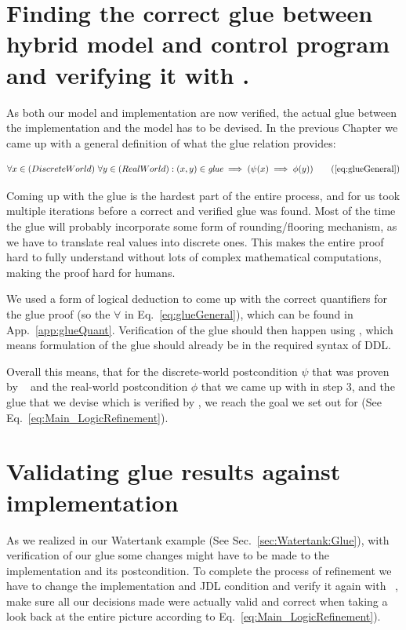 \section{Finding the correct glue between hybrid model and control program and verifying it with \keym.}
\label{sec:Process:Glue}

As both our model and implementation are now verified, the actual glue between the implementation and the model has to be devised. In the previous Chapter we came up with a general definition of what the glue relation provides:

\begin{equation}
	\centering
	\begin{split}
		\forall x \in (Discrete World)~\forall y \in (Real World):(x,y) \in \textit{glue} \implies (\psi(x) \implies \phi(y))
	\end{split}
	\tag{\ref{eq:glueGeneral}}
\end{equation}

Coming up with the glue is the hardest part of the entire process, and for us took multiple iterations before a correct and verified glue was found. Most of the time the glue will probably incorporate some form of rounding/flooring mechanism, as we have to translate real values into discrete ones. This makes the entire proof hard to fully understand without lots of complex mathematical computations, making the proof hard for humans.

We used a form of logical deduction to come up with the correct quantifiers for the glue proof (so the \(\forall\) in Eq.~\ref{eq:glueGeneral}), which can be found in App.~\ref{app:glueQuant}. Verification of the glue should then happen using \keym, which means formulation of the glue should already be in the required syntax of DDL.

Overall this means, that for the discrete-world postcondition \(\psi\) that was proven by \key~ and the real-world postcondition \(\phi\) that we came up with in step 3, and the glue that we devise which is verified by \keym, we reach the goal we set out for (See Eq.~\ref{eq:Main_LogicRefinement}).

\section{Validating glue results against implementation}
\label{sec:Process:Eval}

As we realized in our Watertank example (See Sec.~\ref{sec:Watertank:Glue}), with verification of our glue some changes might have to be made to the implementation and its postcondition. To complete the process of refinement we have to change the implementation and JDL condition and verify it again with \key~, make sure all our decisions made were actually valid and correct when taking a look back at the entire picture according to Eq.~\ref{eq:Main_LogicRefinement}).


